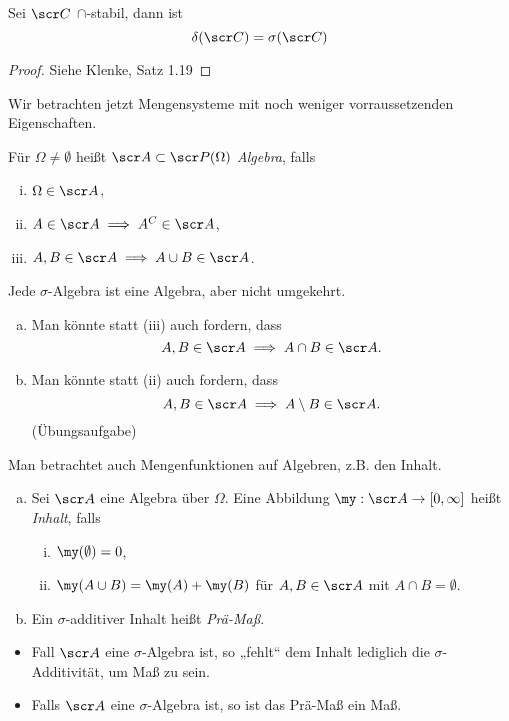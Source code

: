 \begin{st} \label{1.3.3}
	Sei $\scr C$ $\cap$-stabil, dann ist
	\[
		\delta(\scr C) = \sigma(\scr C)
	\]
	\begin{proof}
		Siehe Klenke, Satz 1.19
	\end{proof}
\end{st}

Wir betrachten jetzt Mengensysteme mit noch weniger vorraussetzenden Eigenschaften.

\begin{df} \label{1.3.4}
	Für $\Omega \neq \emptyset$ heißt $\scr A \subset \scr P(\Omega)$ \emph{Algebra}, falls
	\begin{enumerate}[(i)]
		\item
			$\Omega \in \scr A$,
		\item
			$A \in \scr A \implies A^C \in \scr A$,
		\item
			$A,B \in \scr A \implies A \cup B \in \scr A$.
	\end{enumerate}
\end{df}

\begin{nt} \label{1.3.5}
	Jede $\sigma$-Algebra ist eine Algebra, aber nicht umgekehrt.
	\begin{enumerate}[(a)]
		\item
			Man könnte statt (iii) auch fordern, dass
			\[
				A,B \in \scr A \implies A \cap B \in \scr A.
			\]
		\item
			Man könnte statt (ii) auch fordern, dass
			\[
				A,B \in \scr A \implies A \setminus B \in \scr A.
			\]
			(Übungsaufgabe)
	\end{enumerate}
\end{nt}

Man betrachtet auch Mengenfunktionen auf Algebren, z.B. den Inhalt.

\begin{df} \label{1.3.6}
	\begin{enumerate}[(a)]
		\item
			Sei $\scr A$ eine Algebra über $\Omega$.
			Eine Abbildung $\my: \scr A \to [0,\infty]$ heißt \emph{Inhalt}, falls
			\begin{enumerate}[(i)]
				\item
					$\my(\emptyset) = 0$,
				\item
					$\my(A \cup B) = \my(A) + \my(B)$ für $A,B \in \scr A$ mit $A \cap B = \emptyset$.
			\end{enumerate}
		\item
			Ein $\sigma$-additiver Inhalt heißt \emph{Prä-Maß}.
	\end{enumerate}
	\begin{nt*}
		\begin{itemize}
			\item
				Fall $\scr A$ eine $\sigma$-Algebra ist, so „fehlt“ dem Inhalt lediglich die $\sigma$-Additivität, um Maß zu sein.
			\item
				Falls $\scr A$ eine $\sigma$-Algebra ist, so ist das Prä-Maß ein Maß.
		\end{itemize}
	\end{nt*}
\end{df}

